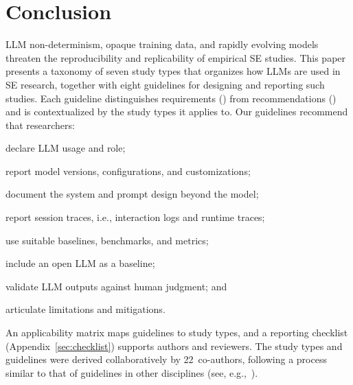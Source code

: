 

\section{Conclusion}

LLM non-determinism, opaque training data, and rapidly evolving models
threaten the reproducibility and replicability of empirical SE studies.
This paper presents a taxonomy of seven study types that organizes how
LLMs are used in SE research, together with eight guidelines for
designing and reporting such studies.
Each guideline distinguishes requirements (\must) from recommendations
(\should) and is contextualized by the study types it
applies to.
Our guidelines recommend that researchers:
\begin{enumerate*}[label=(\arabic*)]
\item declare LLM usage and role;
\item report model versions, configurations, and customizations;
\item document the system and prompt design beyond the model;
\item report session traces, i.e., interaction logs and runtime traces;
\item use suitable baselines, benchmarks, and metrics;
\item include an open LLM as a baseline;
\item validate LLM outputs against human judgment; and
\item articulate limitations and mitigations.
\end{enumerate*}
An applicability matrix maps guidelines to study types, and a reporting
checklist (Appendix~\ref{sec:checklist}) supports authors and reviewers.
The study types and guidelines were derived collaboratively by
22~co-authors, following a process similar to that of guidelines in
other disciplines (see, e.g.,~\cite{Begg1996}).


